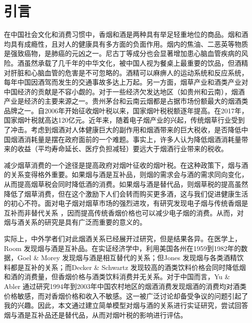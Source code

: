 \documentclass[10pt,a4paper,twocolumn]{PPRAcn} %
\affiliation{
	\quad
	\textit{北京大学物理学院，学号1600011628，序号58. Email: jiaxuan\_li@pku.edu.cn}
} %
\begin{document}
\flushbottom %

\maketitle %


\thispagestyle{empty} %




\section{引言}
在中国社会文化和消费习惯中，香烟和酒是两种具有举足轻重地位的商品。烟和酒均具有成瘾性，且对人的健康具有多方面的负面作用。烟内的焦油、二恶英等物质是强致癌物，是肺癌的元凶之一。尼古丁等成分也会显著增加患心脑血管疾病的风险。酒虽然承载了几千年的中华文化，被中国人视为餐桌上最重要的饮品，但酒精对肝脏和心脑血管的危害是不可忽略的。酒精可以麻痹人的运动系统和反应系统，每年中国因酒驾而发生的交通事故多达上万起。另一方面，烟草产业和酒类产业对中国经济的贡献是不容小觑的。对于一些经济欠发达地区（如贵州和云南），烟酒产业是经济的主要来源之一。贵州茅台和云南云烟都是占据市场份额最大的烟酒类品牌之一。自2006年开始征收烟叶税以来，国家烟叶税税额逐年提高。在2017年，国家烟叶税就高达120亿元。近年来，随着电子烟产业的兴起，传统烟草行业受到了冲击。考虑到烟酒对人体健康巨大的副作用和烟酒带来的巨大税收，是否降低中国烟酒消耗量是摆在政府面前的一个难题。事实上，许多人认为降低烟酒消耗量带来的收益（平均寿命延长、医疗负担减轻）要远大于烟酒行业带来的税收。

减少烟草消费的一个途径是提高政府对烟叶征收的烟叶税。在这种政策下，烟与酒的关系变得格外重要。如果烟与酒是互补品，则烟的需求会与酒的需求同向变化，从而提高烟草税会同时降低酒的消费。如果烟与酒是替代品，则烟草税的提高虽然降低了烟草消费，但在这个激励下人们会转而购买更多酒，这与我们促进健康生活的初心不符。面对电子烟对烟草市场的强烈进攻，有研究发现电子烟与传统香烟是互补而非替代关系 \cite{e-cig2018}，因而提高传统香烟价格也可以减少电子烟的消费。从而，对烟与酒关系的研究是具有广泛而重要的意义的。

实际上，中外学者们对此烟酒关系已经展开过研究，但是结果各异。在医学上，Room \cite{ROOM2004}发现烟与酒是互补品。在实证经济学中，利用美国各州在1959到1982年的数据，Goel \& Morey \cite{Goel1995}发现烟与酒是相互替代的关系；但Jones \cite{Jones1989}发现烟与各类酒精饮料都是互补的关系；而Decker \& Schwartz \cite{Decker2000}发现较高的酒类饮料价格会同时降低烟和酒的消费量，但香烟价格与酒类饮料消费并无关系。对于中国而言，Yu \& Abler \cite{Xiaohua2010Interactions}通过研究1994年到2003年中国农村地区的烟酒消费发现烟酒的消费均对酒类价格敏感，而对香烟价格和收入不敏感。这一被广泛讨论却备受争议的问题引起了我的兴趣。因此，本文通过建立简单模型对烟与酒的关系进行实证研究，尝试回答烟与酒是互补品还是替代品，从而对烟叶税的影响进行评估。
\end{document}
